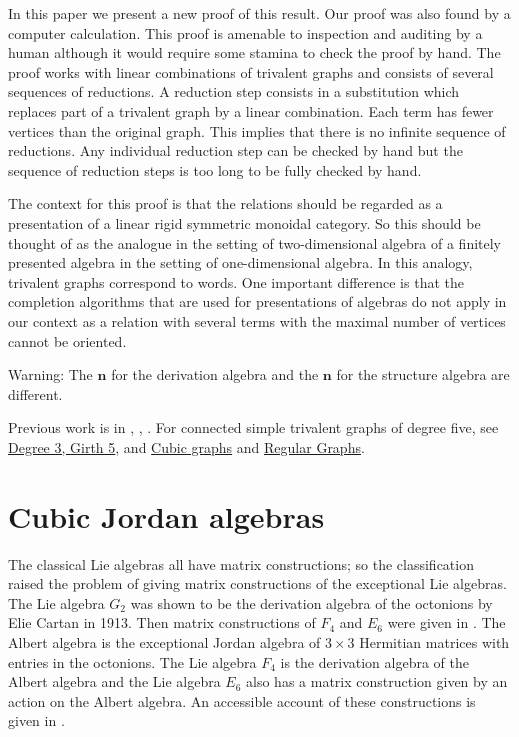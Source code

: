 \documentclass[12pt]{amsart}
\newcommand\nn{\mathbf{n}}
\begin{document}
In this paper we present a new proof of this result. Our proof was also found by a computer calculation.
This proof is amenable to inspection and auditing by a human although it would require some stamina to check the proof by hand. The proof works with linear combinations of trivalent graphs and consists of several sequences of reductions. A reduction step consists in a substitution which replaces part of a trivalent graph by a linear
combination. Each term has fewer vertices than the original graph. This implies that there is no infinite sequence of reductions. Any individual reduction step can be checked by hand but the sequence of reduction steps is too long to be fully checked by hand.

The context for this proof is that the relations should be regarded as a presentation of a linear rigid symmetric monoidal category. So this  should be thought of as the analogue in the setting of two-dimensional algebra of a finitely presented algebra in the setting of one-dimensional algebra. In this analogy, trivalent graphs correspond to words. One important difference is that the completion algorithms that are used for
presentations of algebras do not apply in our context as a relation with several terms with the maximal number of vertices cannot be oriented.

Warning: The $\nn$ for the derivation algebra and the $\nn$ for the structure algebra are different.






Previous work is in \cite[Chapter~19]{Cvitanovic2008}, \cite{gandhi2022}, \cite[\S6.2.3,\S6.7]{morrison2024}.
For connected simple trivalent graphs of degree five, see \href{https://oeis.org/A014372}{Degree 3, Girth 5},
and \href{https://houseofgraphs.org/meta-directory/cubic}{Cubic graphs}
and \href{https://www.mathe2.uni-bayreuth.de/markus/reggraphs.html}{Regular Graphs}.

\section{Cubic Jordan algebras}
The classical Lie algebras
all have matrix constructions; so the classification raised the problem of giving matrix constructions
of the exceptional Lie algebras. The Lie algebra $G_2$ was shown to be the derivation algebra of the octonions by Elie Cartan in 1913. Then matrix constructions of $F_4$ and $E_6$ were given in \cite{freudenthal1953}.
The Albert algebra is the exceptional Jordan algebra of $3\times 3$ Hermitian matrices with entries in the octonions.
The Lie algebra $F_4$ is the derivation algebra of the Albert algebra and the Lie algebra $E_6$ also has a matrix construction given by an action on the Albert algebra. An accessible account of these constructions is given
in \cite{adams1982}. 
\end{document}
